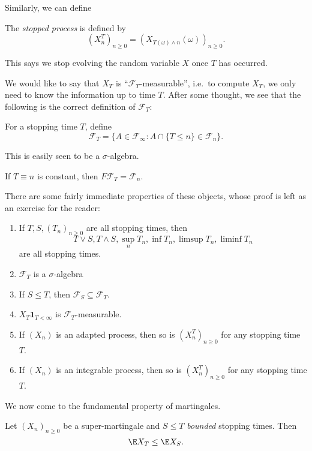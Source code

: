 \documentclass[a4paper]{article}
\begin{document}
Similarly, we can define
\begin{defi}
  The \emph{stopped process} is defined by
  \[
    (X_n^T)_{n \geq 0} = (X_{T(\omega) \wedge n}(\omega))_{n \geq 0}.
  \]
\end{defi}
This says we stop evolving the random variable $X$ once $T$ has occurred.

We would like to say that $X_T$ is ``$\mathcal{F}_T$-measurable'', i.e.\ to compute $X_T$, we only need to know the information up to time $T$. After some thought, we see that the following is the correct definition of $\mathcal{F}_T$:
\begin{defi}[$\mathcal{F}_T$]
  For a stopping time $T$, define
  \[
    \mathcal{F}_T = \{A \in \mathcal{F}_\infty : A \cap \{T \leq n\} \in \mathcal{F}_n\}.
  \]
\end{defi}
This is easily seen to be a $\sigma$-algebra.

\begin{eg}
  If $T \equiv n$ is constant, then $F\mathcal{F}_T = \mathcal{F}_n$.
\end{eg}

There are some fairly immediate properties of these objects, whose proof is left as an exercise for the reader:
\begin{prop}\leavevmode
  \begin{enumerate}
    \item If $T, S, (T_n)_{n \geq 0}$ are all stopping times, then
      \[
        T \vee S, T \wedge S, \sup_n T_n, \inf T_n, \limsup T_n, \liminf T_n
      \]
      are all stopping times.
    \item $\mathcal{F}_T$ is a $\sigma$-algebra
    \item If $S \leq T$, then $\mathcal{F}_S \subseteq \mathcal{F}_T$.
    \item $X_T \mathbf{1}_{T < \infty}$ is $\mathcal{F}_T$-measurable.
    \item If $(X_n)$ is an adapted process, then so is $(X^T_n)_{n \geq 0}$ for any stopping time $T$.
    \item If $(X_n)$ is an integrable process, then so is $(X^T_n)_{n \geq 0}$ for any stopping time $T$.\qedsym
  \end{enumerate}
\end{prop}

We now come to the fundamental property of martingales.
\begin{thm}
  Let $(X_n)_{n \geq 0}$ be a super-martingale and $S \leq T$ \emph{bounded} stopping times. Then
  \[
    \E X_T \leq \E X_S.
  \]
\end{thm}
\end{document}
